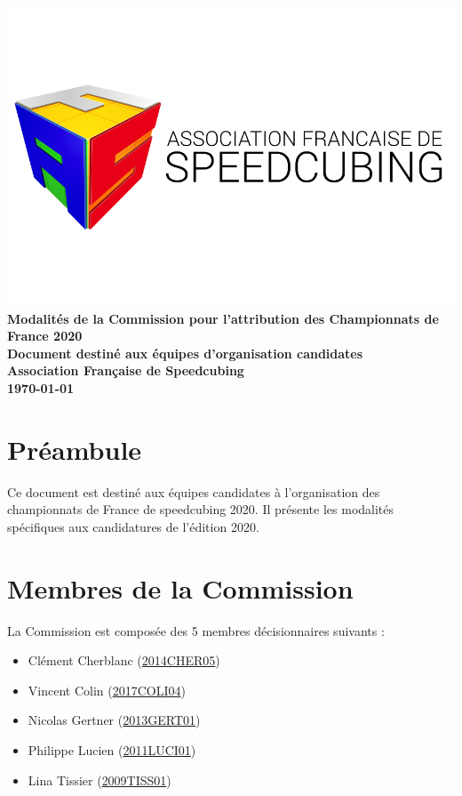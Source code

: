 \documentclass[a4paper,12pt]{scrartcl}
\begin{document}
\sloppy

\begin{titlepage}
    \centering
    \vfill
    \includegraphics[width=\textwidth]{logoafsletters.png}
    \vfill
    {\bfseries\Huge
	Modalités de la Commission pour l'attribution des Championnats de France 2020\\
		\vskip1cm
	\large
        Document destiné aux équipes d'organisation candidates\\
        \vskip3cm
        Association Française de Speedcubing\\
        \vskip2cm
\today
    }    
    \vfill
\end{titlepage}


\pagebreak


\section*{Préambule}

Ce document est destiné aux équipes candidates à l'organisation des championnats de France
de speedcubing 2020. Il présente les modalités spécifiques aux candidatures de l'édition 2020.

\section*{Membres de la Commission}
La Commission est composée des 5 membres décisionnaires suivants :
\begin{itemize}
	\item Clément Cherblanc (\href{https://www.worldcubeassociation.org/persons/2014CHER05}{2014CHER05})
	\item Vincent Colin (\href{https://www.worldcubeassociation.org/persons/2017COLI04}{2017COLI04})
	\item Nicolas Gertner (\href{https://www.worldcubeassociation.org/persons/2013GERT01}{2013GERT01})
	\item Philippe Lucien (\href{https://www.worldcubeassociation.org/persons/2011LUCI01}{2011LUCI01})
	\item Lina Tissier (\href{https://www.worldcubeassociation.org/persons/2009TISS01}{2009TISS01})
\end{itemize}
\end{document}

